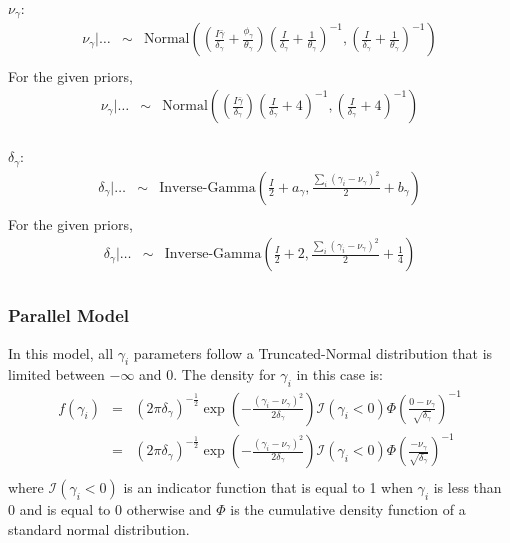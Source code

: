 $\nu_{\gamma}$:\\
\begin{eqnarray*}
\nu_{\gamma}|\dots&\sim&\mbox{Normal}\left(\left(\frac{I\bar{\gamma}}{\delta_{\gamma}}+\frac{\phi_{\gamma}}{\theta_{\gamma}}\right)\left(\frac{I}{\delta_{\gamma}}+\frac{1}{\theta_{\gamma}}\right)^{-1},\left(\frac{I}{\delta_{\gamma}}+\frac{1}{\theta_{\gamma}}\right)^{-1}\right)\\
\end{eqnarray*}
For the given priors,
\begin{eqnarray*}
\nu_{\gamma}|\dots&\sim&\mbox{Normal}\left(\left(\frac{I\bar{\gamma}}{\delta_{\gamma}}\right)\left(\frac{I}{\delta_{\gamma}}+4\right)^{-1},\left(\frac{I}{\delta_{\gamma}}+4\right)^{-1}\right)\\
\end{eqnarray*}

$\delta_{\gamma}$:\\
\begin{eqnarray*}
\delta_{\gamma}|\dots&\sim&\mbox{Inverse-Gamma}\left(\frac{I}{2}+a_{\gamma},\frac{\sum_i(\gamma_i-\nu_{\gamma})^2}{2}+b_{\gamma}\right)\\
\end{eqnarray*}
For the given priors,
\begin{eqnarray*}
\delta_{\gamma}|\dots&\sim&\mbox{Inverse-Gamma}\left(\frac{I}{2}+2,\frac{\sum_i(\gamma_i-\nu_{\gamma})^2}{2}+\frac{1}{4}\right)\\
\end{eqnarray*}


\subsubsection{Parallel Model}

In this model, all $\gamma_i$ parameters follow a Truncated-Normal
distribution that is limited between $-\infty$ and 0.  The density for
$\gamma_i$ in this case is:
\begin{eqnarray*}
f(\gamma_i)&=&(2\pi\delta_{\gamma})^{-\frac{1}{2}}\exp\left(-\frac{(\gamma_i-\nu_{\gamma})^2}{2\delta_{\gamma}}\right)\mathcal{I}\left(\gamma_i<0\right)\Phi\left(\frac{0-\nu_{\gamma}}{\sqrt{\delta_{\gamma}}}\right)^{-1}\\
&=&(2\pi\delta_{\gamma})^{-\frac{1}{2}}\exp\left(-\frac{(\gamma_i-\nu_{\gamma})^2}{2\delta_{\gamma}}\right)\mathcal{I}\left(\gamma_i<0\right)\Phi\left(\frac{-\nu_{\gamma}}{\sqrt{\delta_{\gamma}}}\right)^{-1}\\
\end{eqnarray*}
where $\mathcal{I}\left(\gamma_i<0\right)$ is an indicator function
that is equal to 1 when $\gamma_i$ is less than 0 and is equal to 0
otherwise and $\Phi$ is the cumulative density function of a standard
normal distribution.\\

